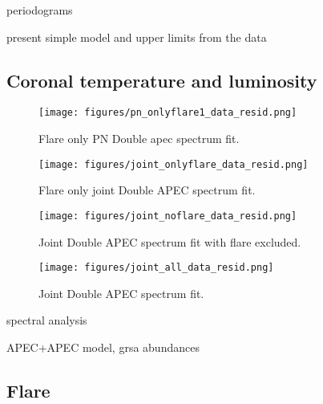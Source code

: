 \documentclass[twocolumn]{aastex631}
\begin{document}
periodograms

present simple model and upper limits from the data

\subsection{Coronal temperature and luminosity}


\begin{figure}[ht!]
    \begin{centering}
        \texttt{[image: figures/pn\_onlyflare1\_data\_resid.png]}
        \caption{
         Flare only PN Double apec spectrum fit.
        }
        \label{fig:spec_pn_onlyflare}
    \end{centering}
\end{figure}

\begin{figure}[ht!]
    \begin{centering}
        \texttt{[image: figures/joint\_onlyflare\_data\_resid.png]}
        \caption{
         Flare only joint Double APEC spectrum fit.
        }
        \label{fig:spec_joint_onlyflare}
    \end{centering}
\end{figure}


\begin{figure}[ht!]
    \begin{centering}
        \texttt{[image: figures/joint\_noflare\_data\_resid.png]}
        \caption{
         Joint Double APEC spectrum fit with flare excluded.
        }
        \label{fig:spec_joint_noflare}
    \end{centering}
\end{figure}

\begin{figure}[ht!]
    \begin{centering}
        \texttt{[image: figures/joint\_all\_data\_resid.png]}
        \caption{
         Joint Double APEC spectrum fit.
        }
        \label{fig:spec_joint_all}
    \end{centering}
\end{figure}


spectral analysis

APEC+APEC model, grsa abundances

\subsection{Flare}
\end{document}
